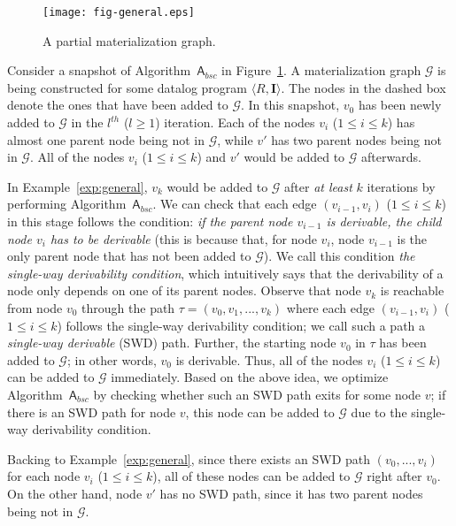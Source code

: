 \documentclass[final,1p,times]{elsarticle}
\begin{document}
\begin{figure}[htbp]
\begin{center}
\texttt{[image: fig-general.eps]}
\caption{A partial materialization graph.}
\label{fig:general}
\end{center}
\end{figure}

\begin{example}\label{exp:general}
Consider a snapshot of Algorithm~$\mathsf{A}_{bsc}$ in
Figure~\ref{fig:general}. A materialization graph $\mathcal{G}$
is being constructed for some datalog program $\langle R, \textbf{I}\rangle$.
The nodes in the dashed box denote the ones that have been added to $\mathcal{G}$.
In this snapshot, $v_0$ has been newly added
to $\mathcal{G}$ in the $l^{th}$ ($l\geq 1$) iteration.
Each of the nodes $v_i$ ($1\leq i\leq k$) has almost one parent node being not in $\mathcal{G}$,
while $v'$ has two parent nodes being not in $\mathcal{G}$.
All of the nodes $v_i$ ($1\leq i\leq k$) and $v'$ would be added to $\mathcal{G}$
afterwards.
\end{example}


In Example~\ref{exp:general}, $v_k$ would be added to $\mathcal{G}$ after \emph{at least} $k$
iterations by performing Algorithm~$\mathsf{A}_{bsc}$.
We can check that each edge $(v_{i-1},v_i)$ ($1\leq i\leq k$) in this stage follows the condition:
\emph{if the parent node $v_{i-1}$ is derivable, the child node $v_i$ has to be derivable} (this
is because that, for node $v_i$, node $v_{i-1}$ is the only parent node that has not been added to $\mathcal{G}$).
We call this condition \emph{the single-way derivability condition}, which intuitively says that the derivability of a
node only depends on one of its parent nodes.
Observe that node $v_k$ is reachable from node $v_0$ through the path $\tau=(v_0,v_1,...,v_k)$ where
each edge $(v_{i-1},v_i)$ ($1\leq i\leq k$) follows the single-way derivability condition;
we call such a path a \emph{single-way derivable} (SWD) path.
Further, the starting node $v_0$ in $\tau$ has been added to $\mathcal{G}$; in other words,
$v_0$ is derivable. Thus, all of the nodes $v_i$ ($1\leq i\leq k$) can be added to
$\mathcal{G}$ immediately.
Based on the above idea, we optimize Algorithm~$\mathsf{A}_{bsc}$ by checking whether such an SWD path
exits for some node $v$; if there is an SWD path for node $v$, this node can be added to $\mathcal{G}$
due to the single-way derivability condition.

Backing to Example~\ref{exp:general}, since
there exists an SWD path $(v_0,...,v_i)$ for each node $v_i$ ($1\leq i\leq k$), all of these nodes
can be added to $\mathcal{G}$ right after $v_0$. On the other hand,
node $v'$ has no SWD path, since it has two parent nodes being not in $\mathcal{G}$.
\end{document}
